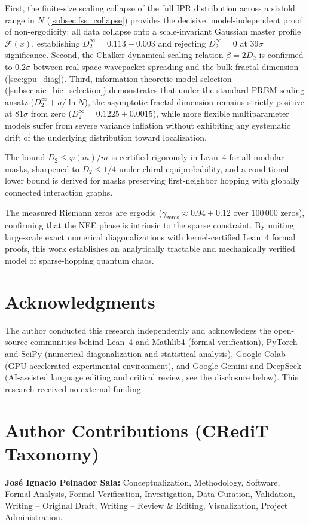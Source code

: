 \documentclass[11pt,a4paper]{article}
\begin{document}
First, the finite-size scaling collapse of the full IPR distribution
across a sixfold range in $N$ (\cref{subsec:fss_collapse}) provides the
decisive, model-independent proof of non-ergodicity: all data collapse
onto a scale-invariant Gaussian master profile $\mathcal{F}(x)$,
establishing $D_2^\infty = 0.113 \pm 0.003$ and rejecting
$D_2^\infty = 0$ at $39\sigma$ significance. Second, the Chalker
dynamical scaling relation $\beta = 2D_2$ is confirmed to $0.2\sigma$
between real-space wavepacket spreading and the bulk fractal dimension
(\cref{sec:gpu_diag}). Third, information-theoretic model selection
(\cref{subsec:aic_bic_selection}) demonstrates that under the standard
PRBM scaling ansatz ($D_2^\infty + a/\ln N$), the asymptotic fractal
dimension remains strictly positive at $81\sigma$ from zero
($D_2^\infty = 0.1225 \pm 0.0015$), while more flexible multiparameter
models suffer from severe variance inflation without exhibiting any
systematic drift of the underlying distribution toward localization.

The bound $D_2 \le \varphi(m)/m$ is certified rigorously in Lean~4 for
all modular masks, sharpened to $D_2 \le 1/4$ under chiral equiprobability,
and a conditional lower bound is derived for masks preserving first-neighbor
hopping with globally connected interaction graphs.

The measured Riemann zeros are ergodic ($\gamma_{\text{zeros}} \approx
0.94 \pm 0.12$ over $100\,000$ zeros), confirming that the NEE phase is
intrinsic to the sparse constraint. By uniting large-scale exact numerical
diagonalizations with kernel-certified Lean~4 formal proofs, this work
establishes an analytically tractable and mechanically verified model of
sparse-hopping quantum chaos.

\section*{Acknowledgments}
The author conducted this research independently and acknowledges the
open-source communities behind Lean~4 and Mathlib4 (formal verification),
PyTorch and SciPy (numerical diagonalization and statistical analysis),
Google Colab (GPU-accelerated experimental environment), and Google Gemini
and DeepSeek (AI-assisted language editing and critical review, see the
disclosure below). This research received no external funding.

\section*{Author Contributions (CRediT Taxonomy)}
\textbf{José Ignacio Peinador Sala:} Conceptualization, Methodology,
Software, Formal Analysis, Formal Verification, Investigation, Data
Curation, Validation, Writing -- Original Draft, Writing -- Review \&
Editing, Visualization, Project Administration.
\end{document}
